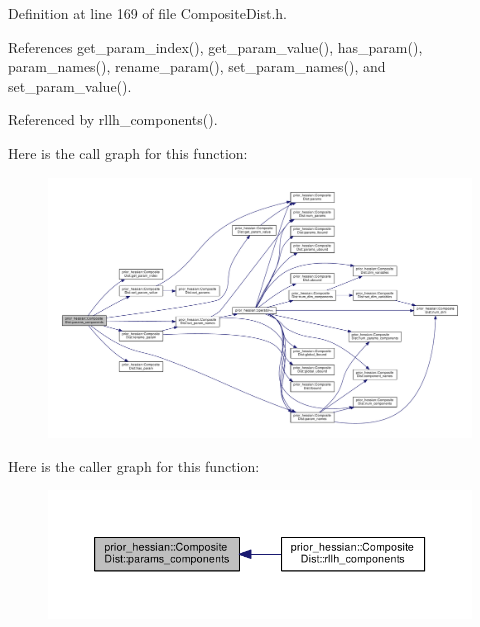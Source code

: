 Definition at line 169 of file Composite\+Dist.\+h.



References get\+\_\+param\+\_\+index(), get\+\_\+param\+\_\+value(), has\+\_\+param(), param\+\_\+names(), rename\+\_\+param(), set\+\_\+param\+\_\+names(), and set\+\_\+param\+\_\+value().



Referenced by rllh\+\_\+components().



Here is the call graph for this function\+:\nopagebreak
\begin{figure}[H]
\begin{center}
\leavevmode
\includegraphics[width=350pt]{classprior__hessian_1_1CompositeDist_a927fed39b2b4e87714c728d6e7b11e8b_cgraph}
\end{center}
\end{figure}




Here is the caller graph for this function\+:\nopagebreak
\begin{figure}[H]
\begin{center}
\leavevmode
\includegraphics[width=350pt]{classprior__hessian_1_1CompositeDist_a927fed39b2b4e87714c728d6e7b11e8b_icgraph}
\end{center}
\end{figure}



